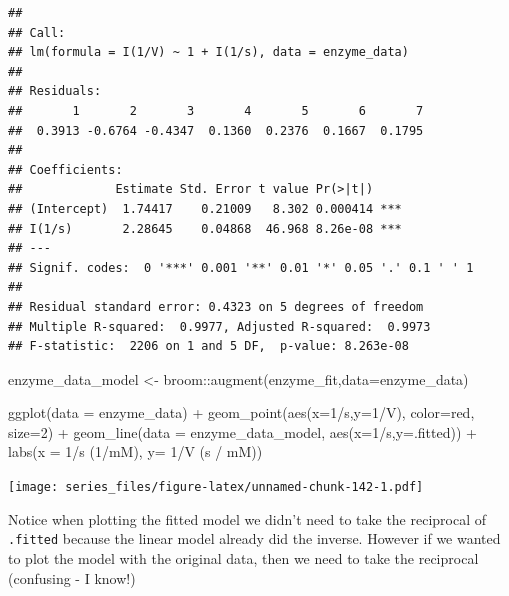 \documentclass[
]{book}
\newenvironment{Shaded}{\begin{snugshade}}{\end{snugshade}}
\newcommand{\AttributeTok}[1]{\textcolor[rgb]{0.77,0.63,0.00}{#1}}
\newcommand{\DecValTok}[1]{\textcolor[rgb]{0.00,0.00,0.81}{#1}}
\newcommand{\FunctionTok}[1]{\textcolor[rgb]{0.00,0.00,0.00}{#1}}
\newcommand{\NormalTok}[1]{#1}
\newcommand{\OtherTok}[1]{\textcolor[rgb]{0.56,0.35,0.01}{#1}}
\newcommand{\SpecialCharTok}[1]{\textcolor[rgb]{0.00,0.00,0.00}{#1}}
\newcommand{\StringTok}[1]{\textcolor[rgb]{0.31,0.60,0.02}{#1}}
\theoremstyle{definition}
\theoremstyle{definition}
\theoremstyle{definition}
\theoremstyle{remark}
\begin{document}
\begin{verbatim}
## 
## Call:
## lm(formula = I(1/V) ~ 1 + I(1/s), data = enzyme_data)
## 
## Residuals:
##       1       2       3       4       5       6       7 
##  0.3913 -0.6764 -0.4347  0.1360  0.2376  0.1667  0.1795 
## 
## Coefficients:
##             Estimate Std. Error t value Pr(>|t|)    
## (Intercept)  1.74417    0.21009   8.302 0.000414 ***
## I(1/s)       2.28645    0.04868  46.968 8.26e-08 ***
## ---
## Signif. codes:  0 '***' 0.001 '**' 0.01 '*' 0.05 '.' 0.1 ' ' 1
## 
## Residual standard error: 0.4323 on 5 degrees of freedom
## Multiple R-squared:  0.9977, Adjusted R-squared:  0.9973 
## F-statistic:  2206 on 1 and 5 DF,  p-value: 8.263e-08
\end{verbatim}

\begin{Shaded}
\begin{Highlighting}[]
\NormalTok{enzyme\_data\_model }\OtherTok{\textless{}{-}}\NormalTok{ broom}\SpecialCharTok{::}\FunctionTok{augment}\NormalTok{(enzyme\_fit,}\AttributeTok{data=}\NormalTok{enzyme\_data)}

\FunctionTok{ggplot}\NormalTok{(}\AttributeTok{data =}\NormalTok{ enzyme\_data) }\SpecialCharTok{+}
  \FunctionTok{geom\_point}\NormalTok{(}\FunctionTok{aes}\NormalTok{(}\AttributeTok{x=}\DecValTok{1}\SpecialCharTok{/}\NormalTok{s,}\AttributeTok{y=}\DecValTok{1}\SpecialCharTok{/}\NormalTok{V),}
             \AttributeTok{color=}\StringTok{\textquotesingle{}red\textquotesingle{}}\NormalTok{,}
             \AttributeTok{size=}\DecValTok{2}\NormalTok{) }\SpecialCharTok{+}
  \FunctionTok{geom\_line}\NormalTok{(}\AttributeTok{data =}\NormalTok{ enzyme\_data\_model,}
            \FunctionTok{aes}\NormalTok{(}\AttributeTok{x=}\DecValTok{1}\SpecialCharTok{/}\NormalTok{s,}\AttributeTok{y=}\NormalTok{.fitted)) }\SpecialCharTok{+}
  \FunctionTok{labs}\NormalTok{(}\AttributeTok{x =} \StringTok{\textquotesingle{}1/s (1/mM)\textquotesingle{}}\NormalTok{,}
       \AttributeTok{y=} \StringTok{\textquotesingle{}1/V (s / mM)\textquotesingle{}}\NormalTok{)}
\end{Highlighting}
\end{Shaded}

\texttt{[image: series\_files/figure-latex/unnamed-chunk-142-1.pdf]}

Notice when plotting the fitted model we didn't need to take the reciprocal of \texttt{.fitted} because the linear model already did the inverse. However if we wanted to plot the model with the original data, then we need to take the reciprocal (confusing - I know!)
\end{document}
